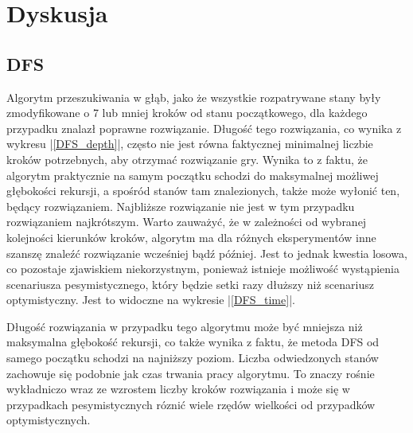 \documentclass{classrep}
\begin{document}
    \section{Dyskusja} {

        \subsection{DFS} {
            Algorytm przeszukiwania w głąb, jako że wszystkie rozpatrywane stany były
            zmodyfikowane o 7 lub mniej kroków od stanu początkowego, dla każdego przypadku
            znalazł poprawne rozwiązanie. Długość tego rozwiązania, co wynika z wykresu
            |\ref{DFS_depth}|, często nie jest równa faktycznej minimalnej liczbie kroków potrzebnych, aby otrzymać
            rozwiązanie gry. Wynika to z faktu, że algorytm praktycznie na samym początku schodzi
            do maksymalnej możliwej głębokości rekursji, a spośród stanów tam znalezionych,
            także może wyłonić ten, będący rozwiązaniem. Najbliższe rozwiązanie nie jest w tym
            przypadku rozwiązaniem najkrótszym. Warto zauważyć, że w zależności od wybranej
            kolejności kierunków kroków, algorytm ma dla różnych eksperymentów inne szanszę
            znaleźć rozwiązanie wcześniej bądź później. Jest to jednak kwestia losowa, co pozostaje
            zjawiskiem niekorzystnym, ponieważ istnieje możliwość wystąpienia scenariusza
            pesymistycznego, który będzie setki razy dłuższy niż scenariusz optymistyczny.
            Jest to widoczne na wykresie |\ref{DFS_time}|.


            Długość rozwiązania w przypadku tego algorytmu może być mniejsza niż maksymalna
            głębokość rekursji, co także wynika z faktu, że metoda DFS od samego początku
            schodzi na najniższy poziom. Liczba odwiedzonych stanów zachowuje się podobnie
            jak czas trwania pracy algorytmu. To znaczy rośnie wykładniczo wraz ze wzrostem
            liczby kroków rozwiązania i może się w przypadkach pesymistycznych róznić wiele
            rzędów wielkości od przypadków optymistycznych.
        }

}
\end{document}

